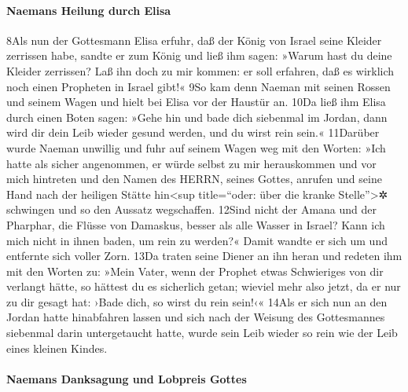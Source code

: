 \hypertarget{naemans-heilung-durch-elisa}{%
\paragraph{Naemans Heilung durch
Elisa}\label{naemans-heilung-durch-elisa}}

8Als nun der Gottesmann Elisa erfuhr, daß der König von Israel seine
Kleider zerrissen habe, sandte er zum König und ließ ihm sagen: »Warum
hast du deine Kleider zerrissen? Laß ihn doch zu mir kommen: er soll
erfahren, daß es wirklich noch einen Propheten in Israel gibt!« 9So kam
denn Naeman mit seinen Rossen und seinem Wagen und hielt bei Elisa vor
der Haustür an. 10Da ließ ihm Elisa durch einen Boten sagen: »Gehe hin
und bade dich siebenmal im Jordan, dann wird dir dein Leib wieder gesund
werden, und du wirst rein sein.« 11Darüber wurde Naeman unwillig und
fuhr auf seinem Wagen weg mit den Worten: »Ich hatte als sicher
angenommen, er würde selbst zu mir herauskommen und vor mich hintreten
und den Namen des HERRN, seines Gottes, anrufen und seine Hand nach der
heiligen Stätte hin\textless sup title=``oder: über die kranke
Stelle''\textgreater✲ schwingen und so den Aussatz wegschaffen. 12Sind
nicht der Amana und der Pharphar, die Flüsse von Damaskus, besser als
alle Wasser in Israel? Kann ich mich nicht in ihnen baden, um rein zu
werden?« Damit wandte er sich um und entfernte sich voller Zorn. 13Da
traten seine Diener an ihn heran und redeten ihm mit den Worten zu:
»Mein Vater, wenn der Prophet etwas Schwieriges von dir verlangt hätte,
so hättest du es sicherlich getan; wieviel mehr also jetzt, da er nur zu
dir gesagt hat: ›Bade dich, so wirst du rein sein!‹« 14Als er sich nun
an den Jordan hatte hinabfahren lassen und sich nach der Weisung des
Gottesmannes siebenmal darin untergetaucht hatte, wurde sein Leib wieder
so rein wie der Leib eines kleinen Kindes.

\hypertarget{naemans-danksagung-und-lobpreis-gottes}{%
\paragraph{Naemans Danksagung und Lobpreis
Gottes}\label{naemans-danksagung-und-lobpreis-gottes}}

